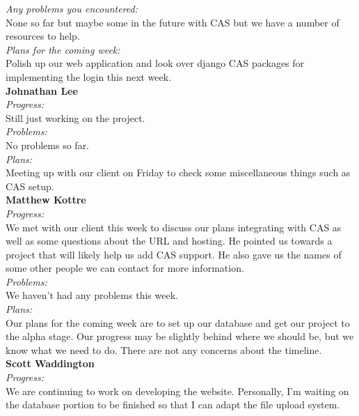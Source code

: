 \noindent\textit{Any problems you encountered:}\\
\noindent None so far but maybe some in the future with CAS but we have a number of resources to help.\\

\noindent\textit{Plans for the coming week:}\\
\noindent Polish up our web application and look over django CAS packages for implementing the login this next week. \\

\noindent\textbf{Johnathan Lee}\\
\noindent\textit{Progress:}\\
Still just working on the project. \\ 

\noindent\textit{Problems:}\\
\noindent No problems so far.\\

\noindent\textit{Plans:}\\
\noindent Meeting up with our client on Friday to check some miscellaneous things such as CAS setup.\\

\noindent\textbf{Matthew Kottre}\\
\noindent\textit{Progress:}\\
We met with our client this week to discuss our plans integrating with CAS as well as some questions about the URL and hosting. He pointed us towards a project that will likely help us add CAS support. He also gave us the names of some other people we can contact for more information.\\

\noindent\textit{Problems:}\\
\noindent We haven't had any problems this week.\\

\noindent\textit{Plans:}\\
\noindent Our plans for the coming week are to set up our database and get our project to the alpha stage. Our progress may be slightly behind where we should be, but we know what we need to do. There are not any concerns about the timeline.\\

\noindent\textbf{Scott Waddington}\\
\noindent\textit{Progress:}\\
We are continuing to work on developing the website. Personally, I'm waiting on the database portion to be finished so that I can adapt the file upload system.\\

